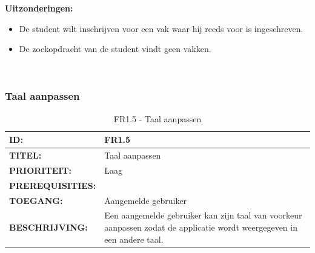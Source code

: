 \textbf{Uitzonderingen:}
\begin{itemize}
\item De student wilt inschrijven voor een vak waar hij reeds voor is ingeschreven.
\item De zoekopdracht van de student vindt geen vakken.

\end{itemize}
\
\subsubsection{Taal aanpassen}
\noindent\begin{table}[H]
            \begin{tabular}{l | p{10cm}}
                \textbf{ID:} & FR1.5 \\ \hline
                \textbf{TITEL:} & Taal aanpassen\\ \hline
                \textbf{PRIORITEIT:} &  Laag \\ \hline
                \textbf{PREREQUISITIES:} & \\ \hline
                \textbf{TOEGANG:} &  Aangemelde gebruiker \\ \hline
                \textbf{BESCHRIJVING:} & Een aangemelde gebruiker kan zijn taal van voorkeur aanpassen zodat de applicatie wordt weergegeven in een andere taal.\\
            \end{tabular}\\
            \caption{FR1.5 - Taal aanpassen}
            \label{tab:FR1.5 - Taal aanpassen}
        \end{table}
        
